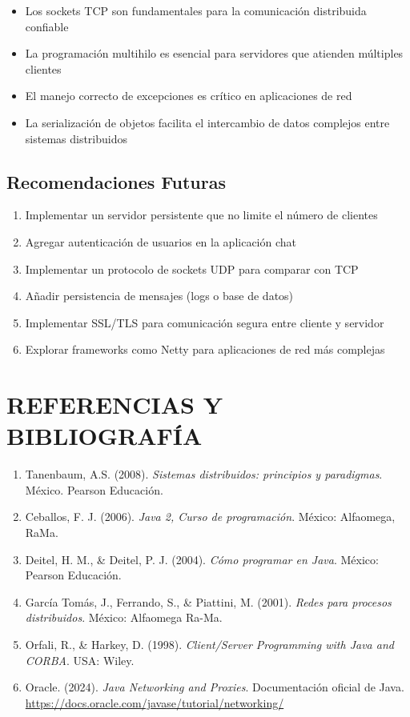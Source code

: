 \documentclass{article}
\begin{document}
\begin{itemize}
    \item Los sockets TCP son fundamentales para la comunicación distribuida confiable
    \item La programación multihilo es esencial para servidores que atienden múltiples clientes
    \item El manejo correcto de excepciones es crítico en aplicaciones de red
    \item La serialización de objetos facilita el intercambio de datos complejos entre sistemas distribuidos
\end{itemize}

\subsection{Recomendaciones Futuras}

\begin{enumerate}
    \item Implementar un servidor persistente que no limite el número de clientes
    \item Agregar autenticación de usuarios en la aplicación chat
    \item Implementar un protocolo de sockets UDP para comparar con TCP
    \item Añadir persistencia de mensajes (logs o base de datos)
    \item Implementar SSL/TLS para comunicación segura entre cliente y servidor
    \item Explorar frameworks como Netty para aplicaciones de red más complejas
\end{enumerate}

\section{REFERENCIAS Y BIBLIOGRAFÍA}

\begin{enumerate}
    \item Tanenbaum, A.S. (2008). \textit{Sistemas distribuidos: principios y paradigmas}. México. Pearson Educación.
    
    \item Ceballos, F. J. (2006). \textit{Java 2, Curso de programación}. México: Alfaomega, RaMa.
    
    \item Deitel, H. M., \& Deitel, P. J. (2004). \textit{Cómo programar en Java}. México: Pearson Educación.
    
    \item García Tomás, J., Ferrando, S., \& Piattini, M. (2001). \textit{Redes para procesos distribuidos}. México: Alfaomega Ra-Ma.
    
    \item Orfali, R., \& Harkey, D. (1998). \textit{Client/Server Programming with Java and CORBA}. USA: Wiley.
    
    \item Oracle. (2024). \textit{Java Networking and Proxies}. Documentación oficial de Java. \url{https://docs.oracle.com/javase/tutorial/networking/}
\end{enumerate}
\end{document}
